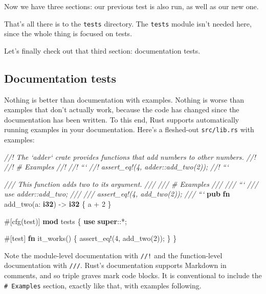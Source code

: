 \documentclass[a4paper,]{book}
\newenvironment{Shaded}{\begin{snugshade}}{\end{snugshade}}
\newcommand{\KeywordTok}[1]{\textcolor[rgb]{0.13,0.29,0.53}{\textbf{{#1}}}}
\newcommand{\DecValTok}[1]{\textcolor[rgb]{0.00,0.00,0.81}{{#1}}}
\newcommand{\CommentTok}[1]{\textcolor[rgb]{0.56,0.35,0.01}{\textit{{#1}}}}
\newcommand{\OtherTok}[1]{\textcolor[rgb]{0.56,0.35,0.01}{{#1}}}
\newcommand{\NormalTok}[1]{{#1}}
\begin{document}
Now we have three sections: our previous test is also run, as well as
our new one.

That's all there is to the \texttt{tests} directory. The \texttt{tests}
module isn't needed here, since the whole thing is focused on tests.

Let's finally check out that third section: documentation tests.

\subsection{Documentation tests}\label{documentation-tests}

Nothing is better than documentation with examples. Nothing is worse
than examples that don't actually work, because the code has changed
since the documentation has been written. To this end, Rust supports
automatically running examples in your documentation. Here's a
fleshed-out \texttt{src/lib.rs} with examples:

\begin{Shaded}
\begin{Highlighting}[]
\CommentTok{//! The `adder` crate provides functions that add numbers to other numbers.}
\CommentTok{//!}
\CommentTok{//! # Examples}
\CommentTok{//!}
\CommentTok{//! ```}
\CommentTok{//! assert_eq!(4, adder::add_two(2));}
\CommentTok{//! ```}

\CommentTok{/// This function adds two to its argument.}
\CommentTok{///}
\CommentTok{/// # Examples}
\CommentTok{///}
\CommentTok{/// ```}
\CommentTok{/// use adder::add_two;}
\CommentTok{///}
\CommentTok{/// assert_eq!(4, add_two(2));}
\CommentTok{/// ```}
\KeywordTok{pub} \KeywordTok{fn} \NormalTok{add_two(a: }\KeywordTok{i32}\NormalTok{) -> }\KeywordTok{i32} \NormalTok{\{}
    \NormalTok{a + }\DecValTok{2}
\NormalTok{\}}

\OtherTok{#[}\NormalTok{cfg}\OtherTok{(}\NormalTok{test}\OtherTok{)]}
\KeywordTok{mod} \NormalTok{tests \{}
    \KeywordTok{use} \KeywordTok{super}\NormalTok{::*;}

    \OtherTok{#[}\NormalTok{test}\OtherTok{]}
    \KeywordTok{fn} \NormalTok{it_works() \{}
        \OtherTok{assert_eq!}\NormalTok{(}\DecValTok{4}\NormalTok{, add_two(}\DecValTok{2}\NormalTok{));}
    \NormalTok{\}}
\NormalTok{\}}
\end{Highlighting}
\end{Shaded}

Note the module-level documentation with \texttt{//!} and the
function-level documentation with \texttt{///}. Rust's documentation
supports Markdown in comments, and so triple graves mark code blocks. It
is conventional to include the \texttt{\#\ Examples} section, exactly
like that, with examples following.
\end{document}
